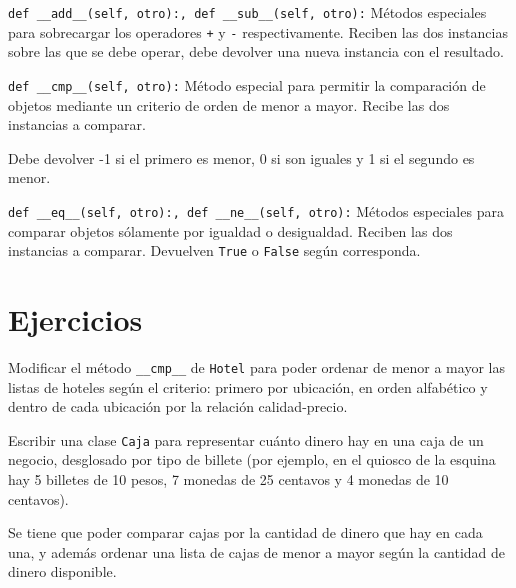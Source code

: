 \begin{referencia_python}
\begin{sintaxis}{\lstinline!def __add__(self, otro):, def __sub__(self, otro):!}
Métodos especiales para sobrecargar los operadores \lstinline!+! y
\lstinline!-! respectivamente.  Reciben las dos instancias sobre las
que se debe operar, debe devolver una nueva instancia con el
resultado.
\end{sintaxis}

\begin{sintaxis}{\lstinline!def __cmp__(self, otro):!}
Método especial para permitir la comparación de objetos mediante un
criterio de orden de menor a mayor.  Recibe las dos instancias a
comparar.

Debe devolver -1 si el primero es menor, 0 si son iguales y 1 si el
segundo es menor.
\end{sintaxis}

\begin{sintaxis}{\lstinline!def __eq__(self, otro):, def __ne__(self, otro):!}
Métodos especiales para comparar objetos sólamente por igualdad o
desigualdad.  Reciben las dos instancias a comparar.  Devuelven
\lstinline!True! o \lstinline!False! según corresponda.
\end{sintaxis}

\end{referencia_python}


\newpage
\section{Ejercicios}

\begin{ejercicio}
Modificar el método \lstinline!__cmp__! de \lstinline!Hotel!
para poder ordenar de menor a mayor las listas de hoteles según el criterio:
primero por ubicación, en orden alfabético y dentro de cada ubicación por
la relación calidad-precio.
\end{ejercicio}

\begin{ejercicio}
Escribir una clase \lstinline!Caja! para representar cuánto
dinero hay en una caja de un negocio, desglosado por tipo de billete (por
ejemplo, en el quiosco de la esquina hay 5 billetes de 10 pesos, 7 monedas
de 25 centavos y 4 monedas de 10 centavos).

Se tiene que poder comparar cajas por la cantidad de dinero que
hay en cada una, y además ordenar una lista de cajas
de menor a mayor según la cantidad de dinero disponible.
\end{ejercicio}


